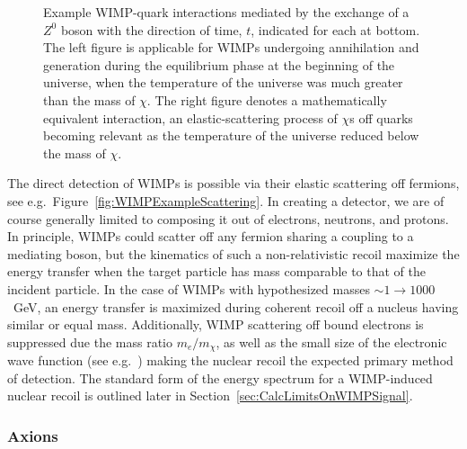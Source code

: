 			\begin{figure}
				\centering
				\def\figheight{0.4\textwidth}
				\caption[Relevant WIMP-quark interactions during hot and cold universe epochs.]{Example WIMP-quark 
				interactions mediated by the exchange of a $Z^{0}$ boson with the direction
				of time, $t$, indicated for each at bottom.  The left figure is applicable for WIMPs undergoing annihilation and 
				generation during the equilibrium phase at
				the beginning of the universe, when the temperature of the universe was much greater than the mass of $\chi$.
				The right figure denotes a mathematically equivalent interaction, an elastic-scattering process
				of $\chi$s off quarks becoming relevant as the temperature of the universe reduced below the mass of $\chi$.}
				\label{fig:WIMPExample}
			\end{figure}	
			
	The direct detection of WIMPs is possible via their elastic scattering off fermions, see e.g.~Figure~\ref{fig:WIMPExampleScattering}.  In creating a
detector, we are of course generally limited to composing it out of electrons,
neutrons, and protons.  In principle, WIMPs could scatter off any fermion
sharing a coupling to a mediating boson, but the kinematics of such a
non-relativistic recoil maximize the energy transfer when the target particle
has mass comparable to that of the incident particle.  In the case of WIMPs
with hypothesized masses $\sim1\to1000$~GeV, an energy transfer is maximized
during coherent recoil off a nucleus having similar or equal mass.
Additionally, WIMP scattering off bound electrons is suppressed due the mass
ratio $m_{e}/m_{\chi}$, as well as the small size of the electronic wave
function (see e.g.~\cite{Kopp09}) making the nuclear recoil the expected
primary method of detection.  The standard form of the energy spectrum for a
WIMP-induced nuclear recoil is outlined later in
Section~\ref{sec:CalcLimitsOnWIMPSignal}.
	
			\subsubsection{Axions}
			\label{sec:AxionsAsDM}
	
